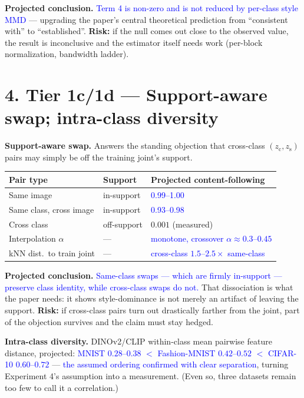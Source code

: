 \documentclass[10pt,letterpaper]{article}
\newcommand{\pj}[1]{\textcolor{blue}{#1}}
\newcommand{\zc}{z_{\mathrm{c}}}
\newcommand{\zs}{z_{\mathrm{s}}}
\begin{document}
\textbf{Projected conclusion.} \pj{Term 4 is non-zero and is not reduced by
per-class style MMD} --- upgrading the paper's central theoretical
prediction from ``consistent with'' to ``established''.
\textbf{Risk:} if the null comes out close to the observed value, the result
is inconclusive and the estimator itself needs work (per-block
normalization, bandwidth ladder).

\section*{4. Tier 1c/1d --- Support-aware swap; intra-class diversity}

\textbf{Support-aware swap.} Answers the standing objection that cross-class
$(\zc,\zs)$ pairs may simply be off the training joint's support.

\begin{table}[h]
\centering
\small
\begin{tabular}{lll}
\toprule
Pair type & Support & Projected content-following \\
\midrule
Same image                & in-support & \pj{0.99--1.00} \\
Same class, cross image   & in-support & \pj{0.93--0.98} \\
Cross class               & off-support & $0.001$ (measured) \\
Interpolation $\alpha$    & --- & \pj{monotone, crossover $\alpha\approx0.3$--$0.45$} \\
kNN dist.\ to train joint & --- & \pj{cross-class $1.5$--$2.5\times$ same-class} \\
\bottomrule
\end{tabular}
\end{table}

\textbf{Projected conclusion.} \pj{Same-class swaps --- which are firmly
in-support --- preserve class identity, while cross-class swaps do not.}
That dissociation is what the paper needs: it shows style-dominance is not
merely an artifact of leaving the support. \textbf{Risk:} if cross-class
pairs turn out drastically farther from the joint, part of the objection
survives and the claim must stay hedged.

\textbf{Intra-class diversity.} DINOv2/CLIP within-class mean pairwise
feature distance, projected: \pj{MNIST $0.28$--$0.38$ $<$ Fashion-MNIST
$0.42$--$0.52$ $<$ CIFAR-10 $0.60$--$0.72$} --- \pj{the assumed ordering
confirmed with clear separation}, turning Experiment 4's assumption into a
measurement. (Even so, three datasets remain too few to call it a
correlation.)
\end{document}
